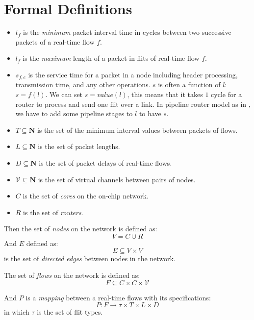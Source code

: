 \documentclass[a4]{article}
\begin{document}
\section{Formal Definitions}
\begin{itemize}
\item $t_f$ is the {\em minimum} packet interval time in cycles between two
successive packets of a real-time flow $f$.
\item $l_f$ is the {\em maximum} length of a packet in flits of real-time flow
$f$.
\item $s_{f,e}$ is the service time for a packet in a node including header 
processing, transmission time, and any other operations. $s$ is often a 
function of $l$: $s=f(l)$. We can set $s=value(l)$, this means that it takes $1$
cycle for a router to process and send one flit over a link. In pipeline router
model as in \cite{PehDelayModel, PehSpecPipeR}, we have to add some pipeline
stages to $l$ to have $s$.
\item $T \subseteq \mathbf{N}$ is the set of the minimum interval values between
packets of flows.
\item $L \subseteq \mathbf{N}$ is the set of packet lengths.
\item $D \subseteq \mathbf{N}$ is the set of packet delays of real-time flows.
\item $\mathcal{V} \subseteq \mathbf{N}$ is the set of virtual channels between pairs of nodes.
\item $C$ is the set of {\em cores} on the on-chip network.
\item $R$ is the set of {\em routers}.
\end{itemize}

Then the set of {\em nodes} on the network is defined as:
\begin{equation}\label{reio}
V = C \cup R
\end{equation}
And $E$ defined as:
\begin{equation}
E \subseteq V \times V 
\end{equation}
is the set of {\em directed edges} between nodes in the network.

The set of {\em flows} on the network is defined as:
\begin{equation}
F \subseteq C \times C \times \mathcal{V} 
\end{equation}

And $P$ is a {\em mapping } between a real-time flows with its specifications:
\begin{equation}
P:F \rightarrow \tau \times T \times L \times D
\end{equation}
in which $\tau$ is the set of flit types.
\end{document}

